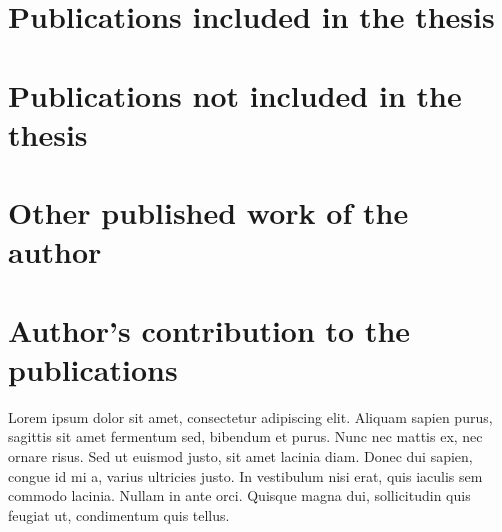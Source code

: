 


\nocite{*} %
\newrefcontext[sorting=none] %

\section*{Publications included in the thesis}
\printbibliography[keyword={included},heading=none,env=roman-numerals]

\section*{Publications not included in the thesis}
\printbibliography[keyword={excluded},heading=none,env=roman-numerals,resetnumbers=false] 
    
\section*{Other published work of the author}
\printbibliography[keyword={other}, heading=none,env=roman-numerals,resetnumbers=false]

\section*{Author’s contribution to the publications}

Lorem ipsum dolor sit amet, consectetur adipiscing elit. Aliquam sapien purus, sagittis sit amet fermentum sed, bibendum et purus. Nunc nec mattis ex, nec ornare risus. Sed ut euismod justo, sit amet lacinia diam. Donec dui sapien, congue id mi a, varius ultricies justo. In vestibulum nisi erat, quis iaculis sem commodo lacinia. Nullam in ante orci. Quisque magna dui, sollicitudin quis feugiat ut, condimentum quis tellus.